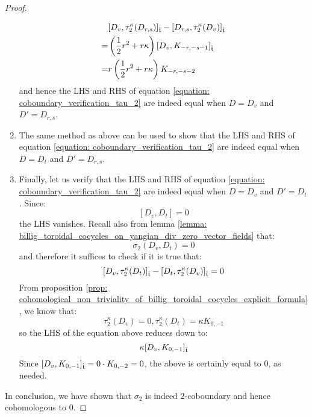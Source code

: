 \begin{proof}
\begin{enumerate}
$$                            \begin{aligned}
                                & [D_v, \tau_2^{\kappa}(D_{r, s})]_{\hat{\mathfrak{t}}} - [D_{r, s}, \tau_2^{\kappa}(D_v)]_{\hat{\mathfrak{t}}}
                                \\
                                = & \left(\frac12 r^2 + r \kappa \right)[D_v, K_{-r, -s - 1}]_{\hat{\mathfrak{t}}}
                                \\
                                = & r \left(\frac12 r^2 + r \kappa \right) K_{-r, -s - 2}
                            \end{aligned}
                        $$
                    and hence the LHS and RHS of equation \eqref{equation: coboundary_verification_tau_2} are indeed equal when $D = D_v$ and $D' = D_{r, s}$.
                    \item The same method as above can be used to show that the LHS and RHS of equation \eqref{equation: coboundary_verification_tau_2} are indeed equal when $D = D_t$ and $D' = D_{r, s}$.
                    \item Finally, let us verify that the LHS and RHS of equation \eqref{equation: coboundary_verification_tau_2} are indeed equal when $D = D_v$ and $D' = D_t$. Since:
                        $$[D_v, D_t] = 0$$
                    the LHS vanishes. Recall also from lemma \ref{lemma: billig_toroidal_cocycles_on_yangian_div_zero_vector_fields} that:
                        $$\sigma_2(D_v, D_t) = 0$$
                    and therefore it suffices to check if it is true that:
                        $$[D_v, \tau_2^{\kappa}(D_t)]_{\hat{\mathfrak{t}}} - [D_t, \tau_2^{\kappa}(D_v)]_{\hat{\mathfrak{t}}} = 0$$
                    From proposition \ref{prop: cohomological_non_triviality_of_billig_toroidal_cocycles_explicit_formula}, we know that:
                        $$\tau_2^{\kappa}(D_v) = 0, \tau_2^{\kappa}(D_t) = \kappa K_{0, -1}$$
                    so the LHS of the equation above reduces down to:
                        $$\kappa [D_v, K_{0, -1}]_{\hat{\mathfrak{t}}}$$
                    Since $[D_v, K_{0, -1}]_{\hat{\mathfrak{t}}} = 0 \cdot K_{0, -2} = 0$, the above is certainly equal to $0$, as needed.
                \end{enumerate}
                In conclusion, we have shown that $\sigma_2$ is indeed $2$-coboundary and hence cohomologous to $0$.
            \end{proof}
